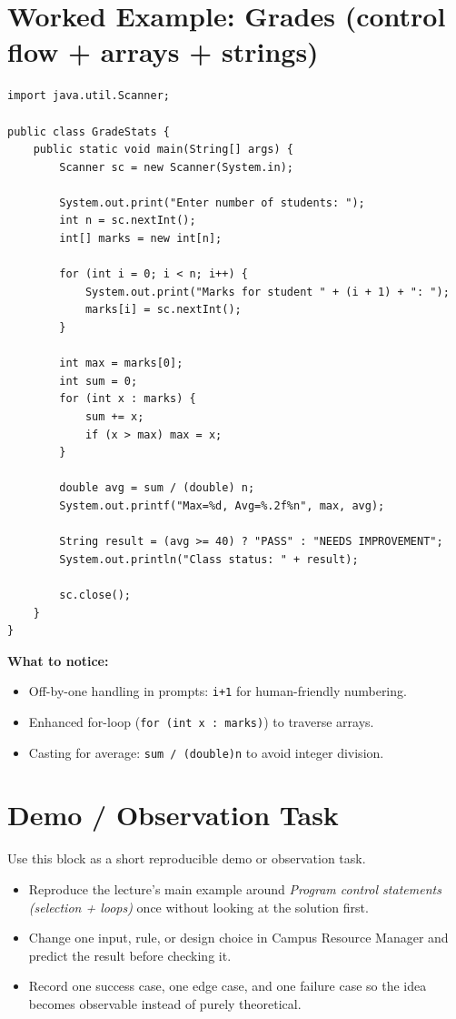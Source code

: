 \documentclass[11pt]{article}
\begin{document}
\section{Worked Example: Grades (control flow + arrays + strings)}
\begin{lstlisting}
import java.util.Scanner;

public class GradeStats {
    public static void main(String[] args) {
        Scanner sc = new Scanner(System.in);

        System.out.print("Enter number of students: ");
        int n = sc.nextInt();
        int[] marks = new int[n];

        for (int i = 0; i < n; i++) {
            System.out.print("Marks for student " + (i + 1) + ": ");
            marks[i] = sc.nextInt();
        }

        int max = marks[0];
        int sum = 0;
        for (int x : marks) {
            sum += x;
            if (x > max) max = x;
        }

        double avg = sum / (double) n;
        System.out.printf("Max=%d, Avg=%.2f%n", max, avg);

        String result = (avg >= 40) ? "PASS" : "NEEDS IMPROVEMENT";
        System.out.println("Class status: " + result);

        sc.close();
    }
}
\end{lstlisting}

\textbf{What to notice:}
\begin{itemize}
  \item Off-by-one handling in prompts: \texttt{i+1} for human-friendly numbering.
  \item Enhanced for-loop (\texttt{for (int x : marks)}) to traverse arrays.
  \item Casting for average: \texttt{sum / (double)n} to avoid integer division.
\end{itemize}

\section{Demo / Observation Task}
Use this block as a short reproducible demo or observation task.
\begin{itemize}
  \item Reproduce the lecture's main example around \textit{Program control statements (selection + loops)} once without looking at the solution first.
  \item Change one input, rule, or design choice in Campus Resource Manager and predict the result before checking it.
  \item Record one success case, one edge case, and one failure case so the idea becomes observable instead of purely theoretical.
\end{itemize}
\notesources{\OOPSUnitISources}
\end{document}
